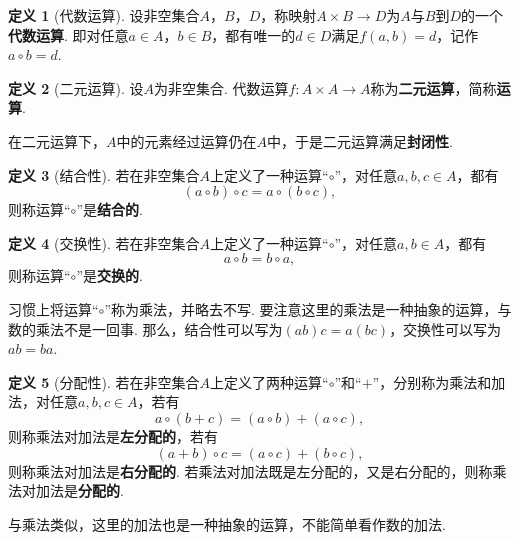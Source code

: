 \documentclass[12pt]{ctexart}
\theoremstyle{definition}
\newtheorem{definition}{定义}
\theoremstyle{plain}
\begin{document}
	\begin{definition}[代数运算]
		设非空集合$A$，$B$，$D$，称映射$A\times B\to D$为$A$与$B$到$D$的一个\textbf{代数运算}. 即对任意$a\in A$，$b\in B$，都有唯一的$d\in D$满足$f(a,b)=d$，记作$a\circ b=d$.
	\end{definition}
	\begin{definition}[二元运算]
		设$A$为非空集合. 代数运算$f:A\times A\to A$称为\textbf{二元运算}，简称\textbf{运算}.
	\end{definition}
	在二元运算下，$A$中的元素经过运算仍在$A$中，于是二元运算满足\textbf{封闭性}.
	\begin{definition}[结合性]
		若在非空集合$A$上定义了一种运算“$\circ$”，对任意$a,b,c\in A$，都有
		$$(a\circ b)\circ c=a\circ(b\circ c),$$
		则称运算“$\circ$”是\textbf{结合的}.
	\end{definition}
	\begin{definition}[交换性]
		若在非空集合$A$上定义了一种运算“$\circ$”，对任意$a,b\in A$，都有
		$$a\circ b=b\circ a,$$
		则称运算“$\circ$”是\textbf{交换的}.
	\end{definition}
	习惯上将运算“$\circ$”称为乘法，并略去不写. 要注意这里的乘法是一种抽象的运算，与数的乘法不是一回事. 那么，结合性可以写为$(ab)c=a(bc)$，交换性可以写为$ab=ba$.
	\begin{definition}[分配性]
		若在非空集合$A$上定义了两种运算“$\circ$”和“$+$”，分别称为乘法和加法，对任意$a,b,c\in A$，若有
		$$a\circ(b+c)=(a\circ b)+(a\circ c),$$
		则称乘法对加法是\textbf{左分配的}，若有
		$$(a+b)\circ c=(a\circ c)+(b\circ c),$$
		则称乘法对加法是\textbf{右分配的}. 若乘法对加法既是左分配的，又是右分配的，则称乘法对加法是\textbf{分配的}.
	\end{definition}
	与乘法类似，这里的加法也是一种抽象的运算，不能简单看作数的加法.
\end{document}
